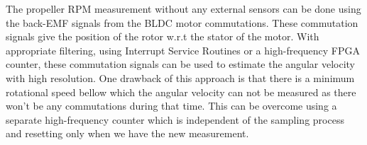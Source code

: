 The propeller RPM measurement without any external sensors can be done using the back-EMF signals from the BLDC motor
commutations. These commutation signals give the position of the rotor w.r.t the stator of the motor. With appropriate
filtering, using Interrupt Service Routines or a high-frequency FPGA counter, these commutation signals can be used to
estimate the angular velocity with high resolution. One drawback of this approach is that there is a minimum rotational
speed bellow which the angular velocity can not be measured as there won't be any commutations during that time. This
can be overcome using a separate high-frequency counter which is independent of the sampling process and resetting only
when we have the new measurement.
